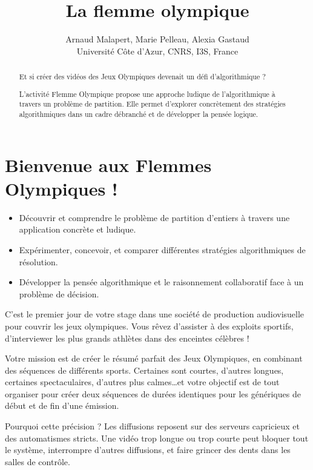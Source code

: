 \documentclass[a4paper,twoside]{article}
\title{La flemme olympique}
\author{Arnaud Malapert, Marie Pelleau, Alexia Gastaud \\
Université Côte d'Azur, CNRS, I3S, France
}
\date{}
\begin{document}
\mymaketitle


\thispagestyle{empty}
\begin{abstract}
  \noindent Et si créer des vidéos des Jeux Olympiques devenait un défi d'algorithmique ?

  \noindent L'activité Flemme Olympique propose une approche ludique de l'algorithmique à travers un problème de partition.
  Elle permet d'explorer concrètement des stratégies algorithmiques dans un cadre débranché et de développer la pensée logique.
\end{abstract}


\renewcommand{\baselinestretch}{0.75}\normalsize
\tableofcontents
\renewcommand{\baselinestretch}{1.0}\normalsize

\ifleaflet
  \cleardoublepage
  \setcounter{page}{1}
\else
  \clearpage
\fi



\section{Bienvenue aux Flemmes Olympiques !}
\label{sec:flemo}


\begin{objectifs}
  \begin{itemize}
  \item Découvrir et comprendre le problème de partition d'entiers à travers une application concrète et ludique.
  \item Expérimenter, concevoir, et comparer différentes stratégies algorithmiques de résolution.
  \item Développer la pensée algorithmique et le raisonnement collaboratif face à un problème de décision.
  \end{itemize}
\end{objectifs}


C'est le premier jour de votre stage dans une société de production audiovisuelle pour couvrir les jeux olympiques.
Vous rêvez d'assister à des exploits sportifs, d'interviewer les plus grands athlètes dans des enceintes célèbres !

Votre mission est de créer le résumé parfait des Jeux Olympiques, en combinant des séquences de différents sports.
 Certaines sont courtes, d'autres longues, certaines spectaculaires, d'autres plus calmes\dots et votre objectif est de tout organiser pour créer deux séquences de durées identiques pour les génériques de début et de fin d'une émission.

Pourquoi cette précision ?
Les diffusions reposent sur des serveurs capricieux et des automatismes stricts.
Une vidéo trop longue ou trop courte peut bloquer tout le système, interrompre d'autres diffusions, et faire grincer des dents dans les salles de contrôle.
\end{document}
